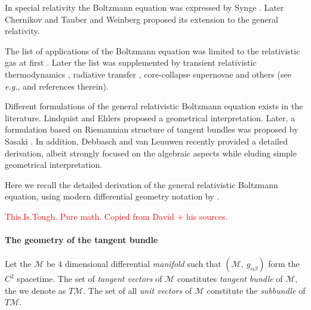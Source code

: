 
In special relativity the Boltzmann equation was expressed by Synge \cite{Synge:1957}. 
Later Chernikov \cite{Chernikov:1962} and Tauber and Weinberg \cite{Tauber:1961} proposed its extension to the general relativity.

The list of applications of the Boltzmann equation was limited to the relativistic gas at first \cite{Israel:1963}. 
Later the list was supplemented by transient relativistic thermodynamics \cite{Israel:1979wp}, radiative transfer \cite{Lindquist:1966}, core-collapse supernovae \cite{Bruenn:1985} and others (see \textit{e.g.}, \cite{Cercignani:2002} and references therein).

Different formulations of the general relativistic Boltzmann equation exists in the literature.
Lindquist \cite{Lindquist:1966} and Ehlers \cite{Ehlers:1971} proposed a geometrical interpretation. 
Later, a formulation based on Riemannian structure of tangent bundles was proposed by Sasaki \cite{Sasaki:1958,Sasaki:1962}. 
In addition, Debbasch and van Leuuwen \cite{Debbasch:2009a,Debbasch:2009b} recently provided a detailed derivation, albeit strongly focused on the algebraic aspects while eluding simple geometrical interpretation. 

Here we recall the detailed derivation of the general relativistic Boltzmann equation, using modern differential geometry notation by .

\textcolor{red}{This.Is.Tough. Pure math. Copied from David + his sources.}


\paragraph{The geometry of the tangent bundle}


Let the $\mathcal{M}$ be $4$ dimensional differential \textit{manifold} such that $(\mathcal{M},\: g_{\alpha\beta})$ form the $C^2$ spacetime. 
The set of \textit{tangent vectors} of $\mathcal{M}$ constitutes \textit{tangent bundle} of $\mathcal{M}$, the we denote as $T\mathcal{M}$. 
The set of all \textit{unit vectors} of $\mathcal{M}$ constitute the \textit{subbundle} of $T\mathcal{M}$.

